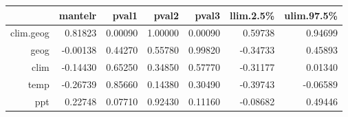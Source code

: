 \begin{table}[ht]
\centering
\begin{tabular}{rrrrrrr}
  \hline
 & mantelr & pval1 & pval2 & pval3 & llim.2.5\% & ulim.97.5\% \\ 
  \hline
clim.geog & 0.81823 & 0.00090 & 1.00000 & 0.00090 & 0.59738 & 0.94699 \\ 
  geog & -0.00138 & 0.44270 & 0.55780 & 0.99820 & -0.34733 & 0.45893 \\ 
  clim & -0.14430 & 0.65250 & 0.34850 & 0.57770 & -0.31177 & 0.01340 \\ 
  temp & -0.26739 & 0.85660 & 0.14380 & 0.30490 & -0.39743 & -0.06589 \\ 
  ppt & 0.22748 & 0.07710 & 0.92430 & 0.11160 & -0.08682 & 0.49446 \\ 
   \hline
\end{tabular}
\end{table}
